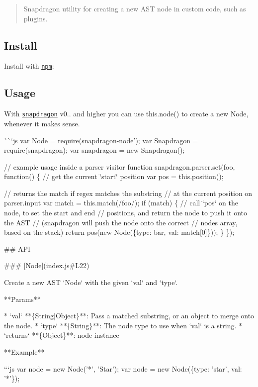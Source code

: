 \begin{quote}
Snapdragon utility for creating a new A\+ST node in custom code, such as plugins. \end{quote}


\subsection*{Install}

Install with \href{https://www.npmjs.com/}{\tt npm}\+:




\subsection*{Usage}

With \href{https://github.com/jonschlinkert/snapdragon}{\tt snapdragon} v0.. and higher you can use {\ttfamily this.\+node()} to create a new {\ttfamily Node}, whenever it makes sense.

\`{}\`{}`js var Node = require(\textquotesingle{}snapdragon-\/node'); var Snapdragon = require(\textquotesingle{}snapdragon\textquotesingle{}); var snapdragon = new Snapdragon();

// example usage inside a parser visitor function snapdragon.\+parser.\+set(\textquotesingle{}foo\textquotesingle{}, function() \{ // get the current \char`\"{}start\char`\"{} position var pos = this.\+position();

// returns the match if regex matches the substring // at the current position on {\ttfamily parser.\+input} var match = this.\+match(/foo/); if (match) \{ // call \char`\"{}pos\char`\"{} on the node, to set the start and end // positions, and return the node to push it onto the A\+ST // (snapdragon will push the node onto the correct // nodes array, based on the stack) return pos(new Node(\{type\+: \textquotesingle{}bar\textquotesingle{}, val\+: match\mbox{[}0\mbox{]}\})); \} \}); 
\begin{DoxyCode}
## API

### [Node](index.js#L22)

Create a new AST `Node` with the given `val` and `type`.

**Params**

* `val` **\{String|Object\}**: Pass a matched substring, or an object to merge onto the node.
* `type` **\{String\}**: The node type to use when `val` is a string.
* `returns` **\{Object\}**: node instance

**Example**

```js
var node = new Node('*', 'Star');
var node = new Node(\{type: 'star', val: '*'\});
\end{DoxyCode}


